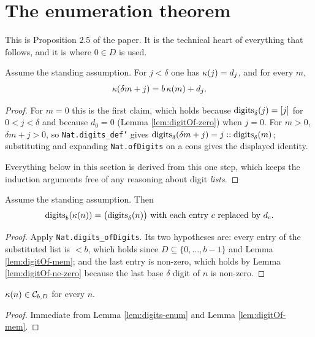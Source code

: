 \section{The enumeration theorem}

This is Proposition 2.5 of the paper. It is the technical heart of
everything that follows, and it is where $0 \in D$ is used.

\begin{lemma}
  \label{lem:enum-recursion}
  \leanok
  Assume the standing assumption. For $j < \delta$ one has
  $\kappa(j) = d_j$, and for every $m$,
  \[
    \kappa(\delta m + j) = b\,\kappa(m) + d_j .
  \]
\end{lemma}
\begin{proof}
  \leanok
  For $m = 0$ this is the first claim, which holds because
  $\operatorname{digits}_\delta(j) = [j]$ for $0 < j < \delta$ and because $d_0 = 0$
  (Lemma \ref{lem:digitOf-zero}) when $j = 0$.  For $m > 0$,
  $\delta m + j > 0$, so \texttt{Nat.digits\_def'} gives
  $\operatorname{digits}_\delta(\delta m + j) = j :: \operatorname{digits}_\delta(m)$; substituting and
  expanding \texttt{Nat.ofDigits} on a cons gives the displayed identity.

  Everything below in this section is derived from this one step, which keeps
  the induction arguments free of any reasoning about digit \emph{lists}.
\end{proof}

\begin{lemma}
  \label{lem:digits-enum}
  \leanok
  Assume the standing assumption. Then
  \[
    \operatorname{digits}_b(\kappa(n)) = \bigl(\operatorname{digits}_\delta(n)\bigr) \text{ with each entry }
      c \text{ replaced by } d_c .
  \]
\end{lemma}
\begin{proof}
  \leanok
  Apply \texttt{Nat.digits\_ofDigits}. Its two hypotheses are: every entry of
  the substituted list is $< b$, which holds since $D \subseteq
  \{0,\ldots,b-1\}$ and Lemma \ref{lem:digitOf-mem}; and the last entry is
  non-zero, which holds by Lemma \ref{lem:digitOf-ne-zero} because the last
  base $\delta$ digit of $n$ is non-zero.
\end{proof}

\begin{lemma}
  \label{lem:enum-mem}
  \leanok
  $\kappa(n) \in \mathcal{C}_{b,D}$ for every $n$.
\end{lemma}
\begin{proof}
  \leanok
  Immediate from Lemma \ref{lem:digits-enum} and Lemma \ref{lem:digitOf-mem}.
\end{proof}

